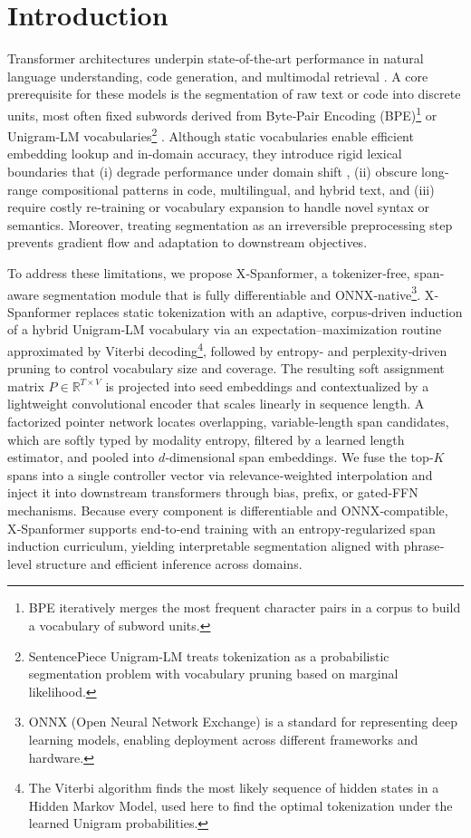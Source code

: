 \section{Introduction}

Transformer architectures underpin state‐of‐the‐art performance in natural language understanding, code generation, and multimodal retrieval \cite{vaswani2017attention,devlin2019bert,radford2019gpt2,raffel2020t5}.  A core prerequisite for these models is the segmentation of raw text or code into discrete units, most often fixed subwords derived from Byte‐Pair Encoding (BPE)\footnote{BPE iteratively merges the most frequent character pairs in a corpus to build a vocabulary of subword units.} \cite{sennrich2016bpe} or Unigram‐LM vocabularies\footnote{SentencePiece Unigram-LM treats tokenization as a probabilistic segmentation problem with vocabulary pruning based on marginal likelihood.} \cite{kudo2018sentencepiece}.  Although static vocabularies enable efficient embedding lookup and in‐domain accuracy, they introduce rigid lexical boundaries that (i) degrade performance under domain shift \cite{galle2021respite}, (ii) obscure long‐range compositional patterns in code, multilingual, and hybrid text, and (iii) require costly re‐training or vocabulary expansion to handle novel syntax or semantics.  Moreover, treating segmentation as an irreversible preprocessing step prevents gradient flow and adaptation to downstream objectives.

To address these limitations, we propose X‐Spanformer, a tokenizer‐free, span‐aware segmentation module that is fully differentiable and ONNX‐native\footnote{ONNX (Open Neural Network Exchange) is a standard for representing deep learning models, enabling deployment across different frameworks and hardware.}.  X‐Spanformer replaces static tokenization with an adaptive, corpus‐driven induction of a hybrid Unigram‐LM vocabulary via an expectation–maximization routine approximated by Viterbi decoding\footnote{The Viterbi algorithm finds the most likely sequence of hidden states in a Hidden Markov Model, used here to find the optimal tokenization under the learned Unigram probabilities.}, followed by entropy‐ and perplexity‐driven pruning to control vocabulary size and coverage.  The resulting soft assignment matrix \(P\in\mathbb{R}^{T\times V}\) is projected into seed embeddings and contextualized by a lightweight convolutional encoder that scales linearly in sequence length.  A factorized pointer network locates overlapping, variable‐length span candidates, which are softly typed by modality entropy, filtered by a learned length estimator, and pooled into \(d\)‐dimensional span embeddings.  We fuse the top‐\(K\) spans into a single controller vector via relevance‐weighted interpolation and inject it into downstream transformers through bias, prefix, or gated‐FFN mechanisms.  Because every component is differentiable and ONNX‐compatible, X‐Spanformer supports end‐to‐end training with an entropy‐regularized span induction curriculum, yielding interpretable segmentation aligned with phrase‐level structure and efficient inference across domains.

